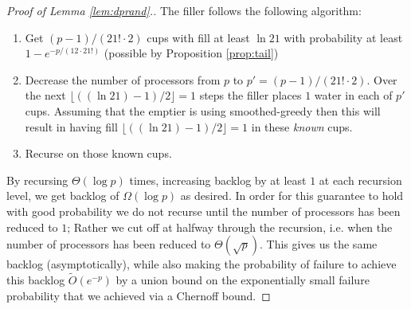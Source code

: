 \documentclass{article}[11pt]
\begin{document}
\begin{proof}[Proof of Lemma \ref{lem:dprand}.]
  The filler follows the following algorithm:
  \begin{enumerate}
    \item Get $(p-1)/(21! \cdot 2)$ cups with fill at least $\ln 21$ with probability at
      least $1-e^{-p/(12\cdot 21!)}$ (possible by Proposition \ref{prop:tail})
    \item Decrease the number of processors from $p$ to $p' = (p-1)/(21!\cdot 2)$.
      Over the next $\lfloor ((\ln 21)-1)/2 \rfloor = 1$ steps the filler places $1$
      water in each of $p'$ cups. Assuming that the emptier is using smoothed-greedy then this
      will result in having fill $\lfloor ((\ln 21)-1) /2 \rfloor = 1$ in these \emph{known} cups.
    \item Recurse on those known cups. 
  \end{enumerate}
  By recursing $\Theta(\log p)$ times, increasing backlog by at least $1$ at
  each recursion level, we get backlog of $\Omega(\log p)$ as desired.
  In order for this guarantee to hold with good probability we do not recurse
  until the number of processors has been reduced to $1$; Rather we cut off at 
  halfway through the recursion, i.e. when the number of processors has been
  reduced to $\Theta(\sqrt{p})$. This gives us the same backlog (asymptotically), 
  while also making the probability of failure to achieve this backlog
  $\tilde{O}(e^{-p})$ by a union bound on the exponentially small failure
  probability that we achieved via a Chernoff bound.
\end{proof}
\end{document}
